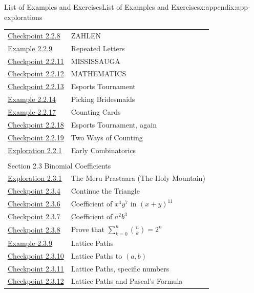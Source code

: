 \documentclass[oneside,10pt,]{book}
\numberwithin{equation}{section}
\begin{document}
\begin{appendixptx}{List of Examples and Exercises}{}{List of Examples and Exercises}{}{}{x:appendix:app-explorations}
\begin{longtable}[l]{ll}
\hyperref[x:exercise:ex-counting-ZAHLEN]{Checkpoint 2.2.8}& ZAHLEN\\
\hyperref[x:example:eg-counting-YEET]{Example 2.2.9}& Repeated Letters\\
\hyperref[x:exercise:ex-counting-MISSISSAUGA]{Checkpoint 2.2.11}& MISSISSAUGA\\
\hyperref[x:exercise:ex-counting-MATHEMATICS]{Checkpoint 2.2.12}& MATHEMATICS\\
\hyperref[x:exercise:ex-counting-esports]{Checkpoint 2.2.13}& Esports Tournament\\
\hyperref[x:example:eg-counting-bridesmaids]{Example 2.2.14}& Picking Bridesmaids\\
\hyperref[x:example:eg-counting-standard-deck]{Example 2.2.17}& Counting Cards\\
\hyperref[x:exercise:ex-counting-esports-comb]{Checkpoint 2.2.18}& Esports Tournament, again\\
\hyperref[x:exercise:ex-counting-Cnk-two-ways]{Checkpoint 2.2.19}& Two Ways of Counting\\
\hyperref[x:exploration:expl-susruta]{Exploration 2.2.1}& Early Combinatorics\\
\multicolumn{2}{l}{\null}\\[1.5ex] \multicolumn{2}{l}{\large Section 2.3 Binomial Coefficients}\\[0.5ex]
\hyperref[x:exploration:expl-pingala]{Exploration 2.3.1}& The Meru Prastaara (The Holy Mountain)\\
\hyperref[x:exercise:ex-counting-pascal-complete]{Checkpoint 2.3.4}& Continue the Triangle\\
\hyperref[x:exercise:ex-counting-coefficient-1]{Checkpoint 2.3.6}& Coefficient of \(x^4y^7\) in \((x+y)^{11}\)\\
\hyperref[x:exercise:ex-counting-coefficient-2]{Checkpoint 2.3.7}& Coefficient of \(a^2b^3\)\\
\hyperref[x:exercise:ex-counting-binomial-identity]{Checkpoint 2.3.8}& Prove that \(\displaystyle\sum_{k=0}^n \binom{n}{k} = 2^n\)\\
\hyperref[x:example:eg-counting-lattice-path]{Example 2.3.9}& Lattice Paths\\
\hyperref[x:exercise:ex-counting-lattice-1]{Checkpoint 2.3.10}& Lattice Paths to \((a,b)\)\\
\hyperref[x:exercise:ex-counting-lattice-2]{Checkpoint 2.3.11}& Lattice Paths, specific numbers\\
\hyperref[x:exercise:ex-counting-lattice-pascal]{Checkpoint 2.3.12}& Lattice Paths and Pascal's Formula\\

\end{longtable}
\end{appendixptx}
\end{document}
